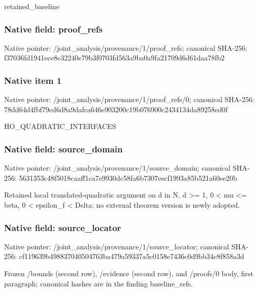 \documentclass[10pt,a4paper]{article}
\begin{document}
\begingroup\raggedright\sloppy retained\_\allowbreak{}baseline\par\endgroup

\subsubsection{Native field: proof\_\allowbreak{}refs}
Native pointer: /joint\_\allowbreak{}analysis/provenance/1/proof\_\allowbreak{}refs; canonical SHA-256: f37036fd1941ece8e32240e79b3f0703fd563a9ba0a9fa21709d6d61daa78fb2

\subsubsection{Native item 1}
Native pointer: /joint\_\allowbreak{}analysis/provenance/1/proof\_\allowbreak{}refs/0; canonical SHA-256: 78dd64d4fbf79cd6d8a9dafca646e903200c19b076900c2434134da89258ed0f

\begingroup\raggedright\sloppy HO\_\allowbreak{}QUADRATIC\_\allowbreak{}INTERFACES\par\endgroup

\subsubsection{Native field: source\_\allowbreak{}domain}
Native pointer: /joint\_\allowbreak{}analysis/provenance/1/source\_\allowbreak{}domain; canonical SHA-256: 5631353c48f5018caaff1ca7e9930dc58fa6b7307eecf1993a85b521a60ee20b

\begingroup\raggedright\sloppy Retained local translated-quadratic argument on d in N,\allowbreak{} d >=\allowbreak{} 1,\allowbreak{} 0 < mu <=\allowbreak{} beta,\allowbreak{} 0 < epsilon\_\allowbreak{}f < Delta;\allowbreak{} no external theorem version is newly adopted.\par\endgroup

\subsubsection{Native field: source\_\allowbreak{}locator}
Native pointer: /joint\_\allowbreak{}analysis/provenance/1/source\_\allowbreak{}locator; canonical SHA-256: cf119639b498837040504763ba479a59337a5c0158e7436c0d9bb34c8f858a3d

\begingroup\raggedright\sloppy Frozen /\allowbreak{}bounds (second row),\allowbreak{} /\allowbreak{}evidence (second row),\allowbreak{} and /\allowbreak{}proofs/\allowbreak{}0 body,\allowbreak{} first paragraph;\allowbreak{} canonical hashes are in the finding baseline\_\allowbreak{}refs.\par\endgroup
\end{document}
